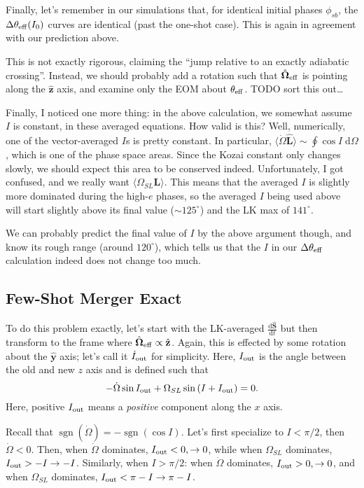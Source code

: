 \documentclass[11pt,
        usenames, %
        dvipsnames %
    ]{article}
\newcommand*{\rd}[2]{\frac{\mathrm{d}#1}{\mathrm{d}#2}}
\newcommand*{\bm}[1]{\boldsymbol{\mathbf{#1}}}
\newcommand*{\uv}[1]{\hat{\bm{#1}}}
\DeclareMathOperator{\sgn}{sgn}
\newcommand*{\ev}[1]{\langle#1\rangle}
\newcommand*{\p}[1]{\left(#1\right)}
\begin{document}
Finally, let's remember in our simulations that, for identical initial phases
$\phi_{sb}$, the $\Delta \theta_{\rm eff}(I_0)$ curves are identical (past the
one-shot case). This is again in agreement with our prediction above.

This is not exactly rigorous, claiming the ``jump relative to an exactly
adiabatic crossing''. Instead, we should probably add a rotation such that
$\uv{\Omega}_{\rm eff}$ is pointing along the $\uv{z}$ axis, and examine only
the EOM about $\theta_{\rm eff}$. TODO sort this out\dots

Finally, I noticed one more thing: in the above calculation, we somewhat assume
$I$ is constant, in these averaged equations. How valid is this? Well,
numerically, one of the vector-averaged $I$s is pretty constant. In particular,
$\ev{\dot{\Omega}\uv{L}} \sim \oint \cos I \;\mathrm{d}\Omega$, which is one of
the phase space areas. Since the Kozai constant only changes slowly, we should
expect this area to be conserved indeed. Unfortunately, I got confused, and we
really want $\ev{\Omega_{SL} \bm{L}}$. This means that the averaged $I$ is
slightly more dominated during the high-$e$ phases, so the averaged $I$ being
used above will start slightly above its final value ($\sim 125^\circ$) and the
LK max of $141^\circ$.

We can probably predict the final value of $I$ by the above argument though, and
know its rough range (around $120^\circ$), which tells us that the $I$ in our
$\Delta \theta_{\rm eff}$ calculation indeed does not change too much.

\subsection{Few-Shot Merger Exact}

To do this problem exactly, let's start with the LK-averaged $\rd{\uv{S}}{t}$
but then transform to the frame where $\uv{\Omega}_{\rm eff} \propto \uv{z}$.
Again, this is effected by some rotation about the $\uv{y}$ axis; let's call it
$\dot{I}_{\rm out}$ for simplicity. Here, $I_{\rm out}$ is the angle between the
old and new $z$ axis and is defined such that
\begin{equation}
    -\dot{\Omega} \sin I_{\rm out} + \Omega_{SL}\sin \p{I + I_{\rm out}}
        = 0.\label{eq:I_out_def}
\end{equation}
Here, positive $I_{\rm out}$ means a \emph{positive} component along the $x$
axis.

Recall that $\sgn(\dot{\Omega}) = -\sgn(\cos I)$. Let's first specialize to $I <
\pi/2$, then $\dot{\Omega} < 0$. Then, when $\dot{\Omega}$ dominates, $I_{\rm
out} < 0, \to 0$, while when $\Omega_{SL}$ dominates, $I_{\rm out} > -I \to -I$.
Similarly, when $I > \pi/2$: when $\dot{\Omega}$ dominates, $I_{\rm out} > 0,
\to 0$, and when $\Omega_{SL}$ dominates, $I_{\rm out} < \pi - I \to \pi - I$.
\end{document}
